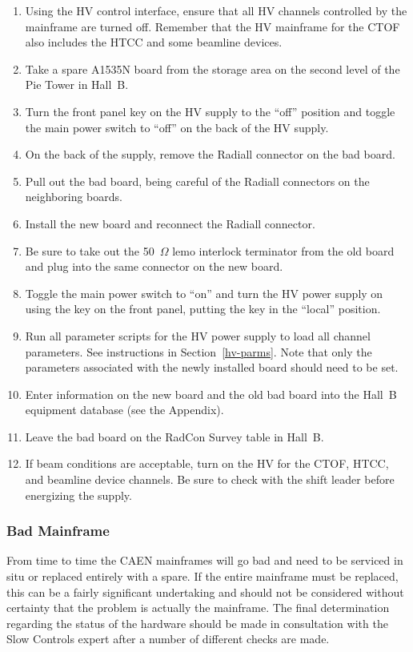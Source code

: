 \documentclass[12pt]{article}
\begin{document}
\begin{enumerate}
\item Using the HV control interface, ensure that all HV channels controlled by the
mainframe are turned off. Remember that the HV mainframe for the CTOF also includes 
the HTCC and some beamline devices.
\item Take a spare A1535N board from the storage area on the second level of the Pie 
Tower in Hall~B.
\item Turn the front panel key on the HV supply to the ``off'' position and toggle 
the main power switch to ``off'' on the back of the HV supply.
\item On the back of the supply, remove the Radiall connector on the bad board.
\item Pull out the bad board, being careful of the Radiall connectors on the 
neighboring boards.
\item Install the new board and reconnect the Radiall connector.
\item Be sure to take out the 50~$\Omega$ lemo interlock terminator from the old 
board and plug into the same connector on the new board.
\item Toggle the main power switch to ``on'' and turn the HV power supply on using 
the key on the front panel, putting the key in the ``local'' position.
\item Run all parameter scripts for the HV power supply to load all channel 
parameters. See instructions in Section~\ref{hv-parms}. Note that only the parameters
associated with the newly installed board should need to be set.
\item Enter information on the new board and the old bad board into the Hall~B 
equipment database (see the Appendix).
\item Leave the bad board on the RadCon Survey table in Hall~B.
\item If beam conditions are acceptable, turn on the HV for the CTOF, HTCC, and
beamline device channels. Be sure to check with the shift leader before energizing 
the supply.
\end{enumerate}

\subsubsection{Bad Mainframe}
\label{mainframe}

From time to time the CAEN mainframes will go bad and need to be serviced in situ or
replaced entirely with a spare. If the entire mainframe must be replaced, this can be
a fairly significant undertaking and should not be considered without certainty that 
the problem is actually the mainframe. The final determination regarding the status 
of the hardware should be made in consultation with the Slow Controls expert after a 
number of different checks are made.
\end{document}
